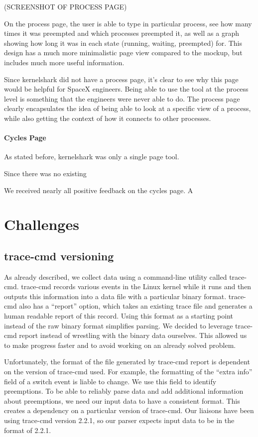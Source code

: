 \documentclass{hmcclinic}
\begin{document}
(SCREENSHOT OF PROCESS PAGE)

On the process page, the user is able to type in particular process, see how many times it was preempted and which processes preempted it, as well as a graph showing how long it was in each state (running, waiting, preempted) for. This design has a much more minimalistic page view compared to the mockup, but includes much more useful information.

Since kernelshark did not have a process page, it's clear to see why this page would be helpful for SpaceX engineers. Being able to use the tool at the process level is something that the engineers were never able to do. The process page clearly encapsulates the idea of being able to look at a specific view of a process, while also getting the context of how it connects to other processes.

\subsubsection{Cycles Page}

As stated before, kernelshark was only a single page tool. 

Since there was no existing 

We received nearly all positive feedback on the cycles page. A


\chapter{Challenges}
\section{trace-cmd versioning} %
  As already described, we collect data using a command-line utility called
  trace-cmd. trace-cmd records various events in the Linux kernel while it runs
  and then outputs this information into a data file with a particular binary
  format. trace-cmd also has a ``report'' option, which takes an existing trace
  file and generates a human readable report of this record. Using this format
  as a starting point instead of the raw binary format simplifies parsing.
  We decided to leverage trace-cmd report instead of wrestling with the binary
  data ourselves. This allowed us to make progress faster and to avoid working
  on an already solved problem.

  Unfortunately, the format of the file generated by trace-cmd report is
  dependent on the version of trace-cmd used. For example, the formatting of the
  ``extra info'' field of a switch event is liable to change. We use this
  field to identify preemptions. To be able to reliably parse data and add
  additional information about preemptions, we need our input data to have
  a consistent format. This creates a dependency on a particular version
  of trace-cmd. Our liaisons have been using trace-cmd version 2.2.1, so
  our parser expects input data to be in the format of 2.2.1.
\end{document}
